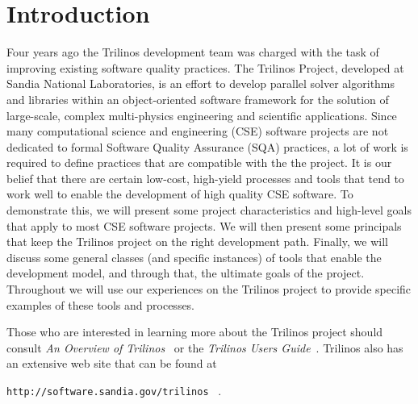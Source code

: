 \documentclass[12pt,relax]{article}
\newcommand{\InlineDirectory}[1]{
  {\hspace{0.01 in}} {\tt #1} {\hspace{0.01 in}}}
\begin{document}

\section{Introduction}
\label{Section:Introduction}


Four years ago the Trilinos development team was charged with the task of 
improving existing software quality practices.  The Trilinos Project, 
developed at Sandia National Laboratories, is an effort to develop parallel
solver algorithms and libraries within an object-oriented software framework 
for the solution of large-scale, complex multi-physics engineering and 
scientific applications.  Since many computational 
science and engineering (CSE) software projects are not dedicated to formal
Software Quality Assurance (SQA) practices, a lot of work is required to 
define practices that are compatible with the the project.
It is our belief that 
there are certain low-cost, high-yield processes and tools that tend to work 
well to enable the development of high quality CSE software.  To demonstrate 
this, we will present some project characteristics and high-level goals that 
apply to most CSE software projects.  We will then present some principals that
keep the Trilinos project on the right development path.
Finally, we will discuss some general classes (and specific
instances) of tools that enable the development model, and through that, 
the ultimate goals of the project.  Throughout we will use our experiences on 
the Trilinos project to provide specific examples of these tools and processes.

Those who are interested in learning more about the Trilinos project should
consult {\it An Overview of Trilinos}~\cite{Trilinos-Overview} or the
{\it Trilinos Users Guide}~\cite{Trilinos-Users-Guide}.  Trilinos also has an
extensive web site that can be found at \newline
\InlineDirectory{http://software.sandia.gov/trilinos}~\cite{Trilinos-home-page}.
\end{document}
